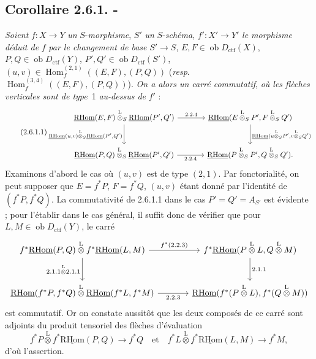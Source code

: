 \documentclass[11pt]{article}
\DeclareMathOperator{\Hom}{Hom}
\newcommand{\R}{\mathrm{R}}\newcommand{\RHomCore}{\mathrm{RHom}}
\newcommand{\ob}{\operatorname{ob}}
\providecommand{\RHom}{\RHomCore}
\providecommand{\uRHom}{\underline{\RHom}}
\providecommand{\ctf}{\mathrm{ctf}}
\providecommand{\RHom}{\RHomCore}
\providecommand{\Hom}{\operatorname{Hom}}
\providecommand{\ob}{\operatorname{ob}}
\providecommand{\RHom}{\R\mathcal{H}om}
\providecommand{\R}{\mathrm R}
\providecommand{\RHom}{\RHomCore}
\providecommand{\Hom}{\operatorname{Hom}}
\begin{document}
\subsection*{Corollaire 2.6.1. -}
\emph{Soient} $f:X\to Y$ \emph{un} $S$-\emph{morphisme}, $S'$ \emph{un} $S$-\emph{schéma}, $f':X'\to Y'$ \emph{le morphisme déduit de} $f$ \emph{par le changement de base} $S'\to S$, $E,F\in\ob D_{\ctf}(X)$, $P,Q\in\ob D_{\ctf}(Y)$, $P',Q'\in\ob D_{\ctf}(S')$, $(u,v)\in\Hom_f^{(2,1)}((E,F),(P,Q))$ (\emph{resp}. $\Hom_f^{(3,4)}((E,F),(P,Q))$). \emph{On a alors un carré commutatif}, \emph{où les flèches verticales sont de type}~1 \emph{au-dessus de} $f'$ :
\begin{equation}\tag{2.6.1.1}
\begin{tikzcd}[column sep=large,row sep=large]
\uRHom(E,F)\overset{\mathrm{L}}{\otimes}_S\uRHom(P',Q') \arrow[r,"2.2.4"] \arrow[d,"{\uRHom(u,v)\overset{\mathrm{L}}{\otimes}_S\uRHom(P',Q')}"'] & \uRHom(E\overset{\mathrm{L}}{\otimes}_SP',F\overset{\mathrm{L}}{\otimes}_SQ') \arrow[d,"{\uRHom(u\overset{\mathrm{L}}{\otimes}_SP',v\overset{\mathrm{L}}{\otimes}_SQ')}"]\\
\uRHom(P,Q)\overset{\mathrm{L}}{\otimes}_S\uRHom(P',Q') \arrow[r,"2.2.4"'] & \uRHom(P\overset{\mathrm{L}}{\otimes}_SP',Q\overset{\mathrm{L}}{\otimes}_SQ').
\end{tikzcd}
\end{equation}
Examinons d'abord le cas où $(u,v)$ est de type $(2,1)$. Par fonctorialité, on peut supposer que $E=f^{*}P$, $F=f^{*}Q$, $(u,v)$ étant donné par l'identité de $(f^{*}P,f^{*}Q)$. La commutativité de 2.6.1.1 dans le cas $P'=Q'=A_{S'}$ est évidente ; pour l'établir dans le cas général, il suffit donc de vérifier que pour $L,M\in\ob D_{\ctf}(Y)$, le carré
\[
\begin{tikzcd}[column sep=large,row sep=large]
f^{*}\uRHom(P,Q)\overset{\mathrm{L}}{\otimes} f^{*}\uRHom(L,M) \arrow[r,"{f^*(2.2.3)}"] \arrow[d,"{2.1.1\overset{\mathrm{L}}{\otimes} 2.1.1}"'] & f^{*}\uRHom(P\overset{\mathrm{L}}{\otimes}L,Q\overset{\mathrm{L}}{\otimes}M) \arrow[d,"2.1.1"]\\
\uRHom(f^{*}P,f^{*}Q)\overset{\mathrm{L}}{\otimes}\uRHom(f^{*}L,f^{*}M) \arrow[r,"2.2.3"'] & \uRHom(f^{*}(P\overset{\mathrm{L}}{\otimes}L),f^{*}(Q\overset{\mathrm{L}}{\otimes}M))
\end{tikzcd}
\]
est commutatif. Or on constate aussitôt que les deux composés de ce carré sont adjoints du produit tensoriel des flèches d'évaluation
\[
f^{*}P\overset{\mathrm{L}}{\otimes} f^{*}\uRHom(P,Q)\longrightarrow f^{*}Q
\quad\text{et}\quad
f^{*}L\overset{\mathrm{L}}{\otimes} f^{*}\uRHom(L,M)\longrightarrow f^{*}M,
\]
d'où l'assertion.
\end{document}
